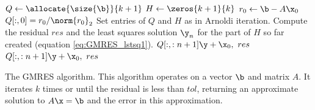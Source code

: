 \begin{algorithm}
\begin{algorithmic}[1]
	\State $Q \gets \allocate{\size{\b}}{k+1}$			
	\State $H \gets \zeros{k+1}{ k}$
	\State $r_0 \gets \b - A\x_0$
	\State $Q[:,0] = r_0/\norm{r_0}_2$
        \State Set entries of $Q$ and $H$ as in Arnoldi iteration.
        \State Compute the residual $res$ and the least squares solution $\y_n$ for the part of $H$ so far created (equation \ref {eq:GMRES_lstsq1}).
            \State {} $Q[:,:n+1]\y + \x_0, \,\, res$
        \EndIf
    \EndFor
    \State {} $Q[:,:n+1]\y + \x_0, \,\, res$						
\EndProcedure
\end{algorithmic}
\caption{The GMRES algorithm. This algorithm operates on a vector $\b$ and matrix $A$. 
It iterates $k$ times or until the residual is less than $tol$, returning an approximate solution to $A\x=\b$ and the error in this approximation.}
\label{alg:gmres}
\end{algorithm}


